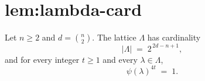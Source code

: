 \chapter{lem:lambda-card}\label{chap:lem_lambda_card}
\begin{lemma}
\label{lem:lambda-card}
Let $n \ge 2$ and $d = \binom{n}{2}$. The lattice $\Lambda$ has cardinality
\[
  |\Lambda| \;=\; 2^{\,2d - n + 1},
\]
and for every integer $t \ge 1$ and every $\lambda \in \Lambda$,
\[
  \psi(\lambda)^{4t} \;=\; 1.
\]
\end{lemma}
